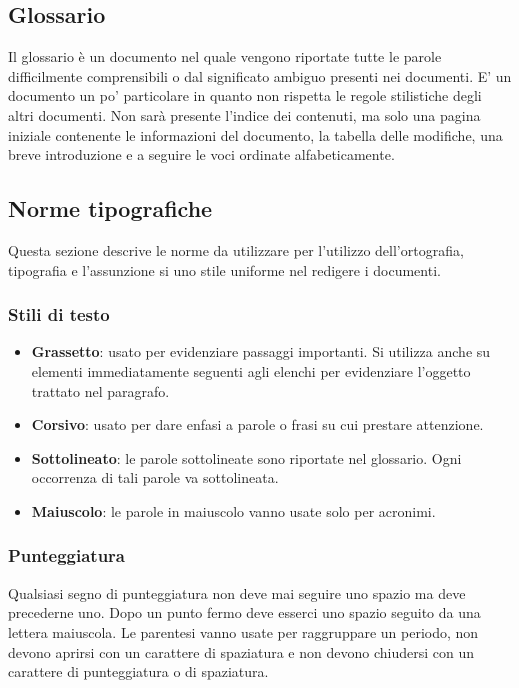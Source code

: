\subsection{Glossario}
Il glossario è un documento nel quale vengono riportate tutte le parole difficilmente comprensibili o dal significato ambiguo presenti nei documenti. E' un documento un po' particolare in quanto non rispetta le regole stilistiche degli altri documenti. Non sarà presente l'indice dei contenuti, ma solo una pagina iniziale contenente le informazioni del documento, la tabella delle modifiche, una breve introduzione e a seguire le voci ordinate alfabeticamente.

\subsection{Norme tipografiche}
Questa sezione descrive le norme da utilizzare per l'utilizzo dell'ortografia, tipografia e l'assunzione si uno stile uniforme nel redigere i documenti.

\subsubsection{Stili di testo}
\begin{itemize}
\item \textbf{Grassetto}: usato per evidenziare passaggi importanti. Si utilizza anche su elementi immediatamente seguenti agli elenchi per evidenziare l'oggetto trattato nel paragrafo.
\item \textbf{Corsivo}: usato per dare enfasi a parole o frasi su cui prestare attenzione.
\item \textbf{Sottolineato}: le parole sottolineate sono riportate nel glossario. Ogni occorrenza di tali parole va sottolineata.
\item \textbf{Maiuscolo}: le parole in maiuscolo vanno usate solo per acronimi.
\end{itemize}

\subsubsection{Punteggiatura}
Qualsiasi segno di punteggiatura non deve mai seguire uno spazio ma deve precederne uno. Dopo un punto fermo deve esserci uno spazio seguito da una lettera maiuscola.
\newline
Le parentesi vanno usate per raggruppare un periodo, non devono aprirsi con un carattere di spaziatura e non devono chiudersi con un carattere di punteggiatura o di spaziatura.

